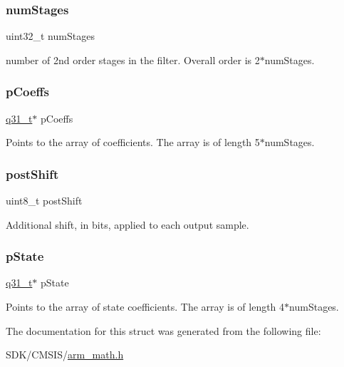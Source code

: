 \subsubsection{\texorpdfstring{num\+Stages}{numStages}}
{\footnotesize\ttfamily uint32\+\_\+t num\+Stages}

number of 2nd order stages in the filter. Overall order is 2$\ast$num\+Stages. \mbox{\label{structarm__biquad__casd__df1__inst__q31_a68888e36167d81cb7836db10367a1682}} 
\subsubsection{\texorpdfstring{p\+Coeffs}{pCoeffs}}
{\footnotesize\ttfamily \mbox{\hyperlink{arm__math_8h_adc89a3547f5324b7b3b95adec3806bc0}{q31\+\_\+t}}$\ast$ p\+Coeffs}

Points to the array of coefficients. The array is of length 5$\ast$num\+Stages. \mbox{\label{structarm__biquad__casd__df1__inst__q31_a74050e9f36542bd56f4052381a82ae8f}} 
\subsubsection{\texorpdfstring{post\+Shift}{postShift}}
{\footnotesize\ttfamily uint8\+\_\+t post\+Shift}

Additional shift, in bits, applied to each output sample. \mbox{\label{structarm__biquad__casd__df1__inst__q31_adee4ba3ee8869865af7d8fa08ca913d6}} 
\subsubsection{\texorpdfstring{p\+State}{pState}}
{\footnotesize\ttfamily \mbox{\hyperlink{arm__math_8h_adc89a3547f5324b7b3b95adec3806bc0}{q31\+\_\+t}}$\ast$ p\+State}

Points to the array of state coefficients. The array is of length 4$\ast$num\+Stages. 

The documentation for this struct was generated from the following file\+:\begin{DoxyCompactItemize}
\item 
S\+D\+K/\+C\+M\+S\+I\+S/\mbox{\hyperlink{arm__math_8h}{arm\+\_\+math.\+h}}\end{DoxyCompactItemize}
